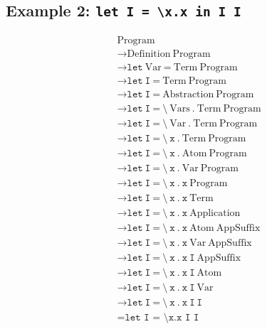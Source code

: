 \documentclass{article}
\begin{document}
\subsection{Example 2: \texttt{let I = \textbackslash x.x in I I}}

\begin{align*}
&\text{Program} \\
&\rightarrow \text{Definition}\ \text{Program} \\
&\rightarrow \texttt{let}\ \text{Var}\ \texttt{=}\ \text{Term}\ \text{Program} \\
&\rightarrow \texttt{let}\ \texttt{I}\ \texttt{=}\ \text{Term}\ \text{Program} \\
&\rightarrow \texttt{let}\ \texttt{I}\ \texttt{=}\ \text{Abstraction}\ \text{Program} \\
&\rightarrow \texttt{let}\ \texttt{I}\ \texttt{=}\ \texttt{\textbackslash}\ \text{Vars}\ \texttt{.}\ \text{Term}\ \text{Program} \\
&\rightarrow \texttt{let}\ \texttt{I}\ \texttt{=}\ \texttt{\textbackslash}\ \text{Var}\ \texttt{.}\ \text{Term}\ \text{Program} \\
&\rightarrow \texttt{let}\ \texttt{I}\ \texttt{=}\ \texttt{\textbackslash}\ \texttt{x}\ \texttt{.}\ \text{Term}\ \text{Program} \\
&\rightarrow \texttt{let}\ \texttt{I}\ \texttt{=}\ \texttt{\textbackslash}\ \texttt{x}\ \texttt{.}\ \text{Atom}\ \text{Program} \\
&\rightarrow \texttt{let}\ \texttt{I}\ \texttt{=}\ \texttt{\textbackslash}\ \texttt{x}\ \texttt{.}\ \text{Var}\ \text{Program} \\
&\rightarrow \texttt{let}\ \texttt{I}\ \texttt{=}\ \texttt{\textbackslash}\ \texttt{x}\ \texttt{.}\ \texttt{x}\ \text{Program} \\
&\rightarrow \texttt{let}\ \texttt{I}\ \texttt{=}\ \texttt{\textbackslash}\ \texttt{x}\ \texttt{.}\ \texttt{x}\ \text{Term} \\
&\rightarrow \texttt{let}\ \texttt{I}\ \texttt{=}\ \texttt{\textbackslash}\ \texttt{x}\ \texttt{.}\ \texttt{x}\ \text{Application} \\
&\rightarrow \texttt{let}\ \texttt{I}\ \texttt{=}\ \texttt{\textbackslash}\ \texttt{x}\ \texttt{.}\ \texttt{x}\ \text{Atom}\ \text{AppSuffix} \\
&\rightarrow \texttt{let}\ \texttt{I}\ \texttt{=}\ \texttt{\textbackslash}\ \texttt{x}\ \texttt{.}\ \texttt{x}\ \text{Var}\ \text{AppSuffix} \\
&\rightarrow \texttt{let}\ \texttt{I}\ \texttt{=}\ \texttt{\textbackslash}\ \texttt{x}\ \texttt{.}\ \texttt{x}\ \texttt{I}\ \text{AppSuffix} \\
&\rightarrow \texttt{let}\ \texttt{I}\ \texttt{=}\ \texttt{\textbackslash}\ \texttt{x}\ \texttt{.}\ \texttt{x}\ \texttt{I}\ \text{Atom} \\
&\rightarrow \texttt{let}\ \texttt{I}\ \texttt{=}\ \texttt{\textbackslash}\ \texttt{x}\ \texttt{.}\ \texttt{x}\ \texttt{I}\ \text{Var} \\
&\rightarrow \texttt{let}\ \texttt{I}\ \texttt{=}\ \texttt{\textbackslash}\ \texttt{x}\ \texttt{.}\ \texttt{x}\ \texttt{I}\ \texttt{I} \\
&= \texttt{let I = \textbackslash x.x I I}
\end{align*}
\end{document}
